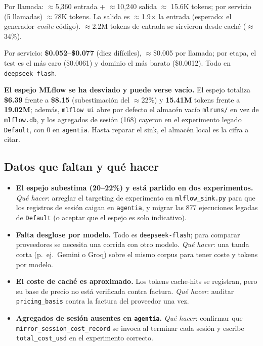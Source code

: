 \documentclass[11pt,a4paper]{article}
\begin{document}
Por llamada: $\approx$5{,}360 entrada + $\approx$10{,}240 salida $\approx$ 15.6K tokens; por
servicio (5 llamadas) $\approx$78K tokens. La salida es $\approx$1.9$\times$ la entrada
(esperado: el generador \emph{emite} código). $\approx$2.2M tokens de entrada se
sirvieron desde caché ($\approx$34\%).

Por servicio: \textbf{\$0.052--\$0.077} (diez difíciles), $\approx$\$0.005 por llamada;
por etapa, el test es el más caro (\$0.0061) y dominio el más barato (\$0.0012). Todo
en \texttt{deepseek-flash}.

\begin{notebox}[colframe=warn]
\textbf{El espejo MLflow se ha desviado y puede verse vacío.} El espejo totaliza
\textbf{\$6.39} frente a \textbf{\$8.15} (subestimación del $\approx$22\%) y
\textbf{15.41M} tokens frente a \textbf{19.02M}; además, \texttt{mlflow
ui} abre por defecto el almacén vacío \texttt{mlruns/} en vez de \texttt{mlflow.db}, y
los agregados de sesión (168) cayeron en el experimento legado \texttt{Default}, con 0
en \texttt{agentia}. Hasta reparar el sink, el almacén local es la cifra a citar.
\end{notebox}

\subsection{Datos que faltan y qué hacer}

\begin{itemize}[leftmargin=1.4em]
  \item \textbf{El espejo subestima (20--22\%) y está partido en dos experimentos.}
  \emph{Qué hacer}: arreglar el targeting de experimento en \texttt{mlflow\_sink.py}
  para que los registros de sesión caigan en \texttt{agentia}, y migrar las 877
  ejecuciones legadas de \texttt{Default} (o aceptar que el espejo es solo
  indicativo).
  \item \textbf{Falta desglose por modelo.} Todo es \texttt{deepseek-flash}; para
  comparar proveedores se necesita una corrida con otro modelo. \emph{Qué hacer}:
  una tanda corta (p.\ ej.\ Gemini o Groq) sobre el mismo corpus para tener coste y
  tokens por modelo.
  \item \textbf{El coste de caché es aproximado.} Los tokens cache-hits se registran,
  pero su base de precio no está verificada contra factura. \emph{Qué hacer}: auditar
  \texttt{pricing\_basis} contra la factura del proveedor una vez.
  \item \textbf{Agregados de sesión ausentes en \texttt{agentia}.} \emph{Qué hacer}:
  confirmar que \texttt{mirror\_session\_cost\_record} se invoca al terminar cada
  sesión y escribe \texttt{total\_cost\_usd} en el experimento correcto.
\end{itemize}
\end{document}
